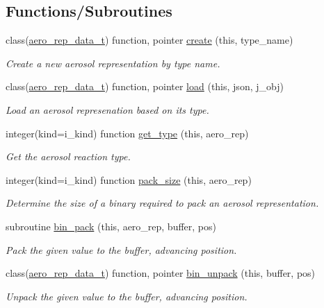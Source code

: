 \subsection*{Functions/\+Subroutines}
\begin{DoxyCompactItemize}
\item 
class(\mbox{\hyperlink{structpmc__aero__rep__data_1_1aero__rep__data__t}{aero\+\_\+rep\+\_\+data\+\_\+t}}) function, pointer \mbox{\hyperlink{namespacepmc__aero__rep__factory_a72db65ee6fcec381e8315f2de1601953}{create}} (this, type\+\_\+name)
\begin{DoxyCompactList}\small\item\em Create a new aerosol representation by type name. \end{DoxyCompactList}\item 
class(\mbox{\hyperlink{structpmc__aero__rep__data_1_1aero__rep__data__t}{aero\+\_\+rep\+\_\+data\+\_\+t}}) function, pointer \mbox{\hyperlink{namespacepmc__aero__rep__factory_a5c9800b3f829b58b00472eaa3622d23c}{load}} (this, json, j\+\_\+obj)
\begin{DoxyCompactList}\small\item\em Load an aerosol represenation based on its type. \end{DoxyCompactList}\item 
integer(kind=i\+\_\+kind) function \mbox{\hyperlink{namespacepmc__aero__rep__factory_aac521bd3a37de6b47b812d4f1ceb5bb1}{get\+\_\+type}} (this, aero\+\_\+rep)
\begin{DoxyCompactList}\small\item\em Get the aerosol reaction type. \end{DoxyCompactList}\item 
integer(kind=i\+\_\+kind) function \mbox{\hyperlink{namespacepmc__aero__rep__factory_ac1e17208623751a66e657d083e327ebd}{pack\+\_\+size}} (this, aero\+\_\+rep)
\begin{DoxyCompactList}\small\item\em Determine the size of a binary required to pack an aerosol representation. \end{DoxyCompactList}\item 
subroutine \mbox{\hyperlink{namespacepmc__aero__rep__factory_a02df230770bd6e28c72b368d4d824788}{bin\+\_\+pack}} (this, aero\+\_\+rep, buffer, pos)
\begin{DoxyCompactList}\small\item\em Pack the given value to the buffer, advancing position. \end{DoxyCompactList}\item 
class(\mbox{\hyperlink{structpmc__aero__rep__data_1_1aero__rep__data__t}{aero\+\_\+rep\+\_\+data\+\_\+t}}) function, pointer \mbox{\hyperlink{namespacepmc__aero__rep__factory_a21bfc8099556674323743966b31846b2}{bin\+\_\+unpack}} (this, buffer, pos)
\begin{DoxyCompactList}\small\item\em Unpack the given value to the buffer, advancing position. \end{DoxyCompactList}\end{DoxyCompactItemize}
